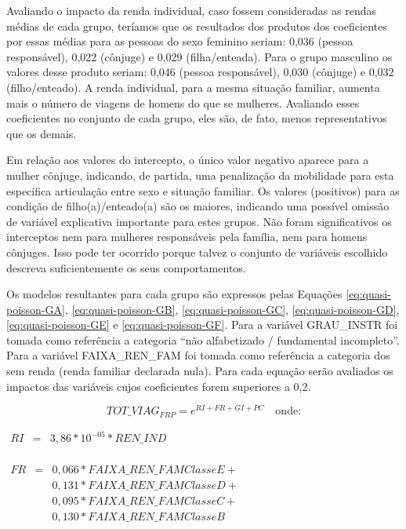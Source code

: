 Avaliando o impacto da renda individual, caso fossem consideradas as rendas médias de cada grupo, teríamos que os resultados dos produtos dos coeficientes por essas médias para as pessoas do sexo feminino seriam: 0,036 (pessoa responsável), 0,022 (cônjuge) e 0,029 (filha/enteada). Para o grupo masculino os valores desse produto seriam: 0,046 (pessoa responsável), 0,030 (cônjuge) e 0,032 (filho/enteado). A renda individual, para a mesma situação familiar, aumenta mais o número de viagens de homens do que se mulheres. Avaliando esses coeficientes no conjunto de cada grupo, eles são, de fato, menos representativos que os demais.

Em relação aos valores do intercepto, o único valor negativo aparece para a mulher cônjuge, indicando, de partida, uma penalização da mobilidade para esta específica articulação entre sexo e situação familiar.
Os valores (positivos) para as condição de filho(a)/enteado(a) são os maiores, indicando uma possível omissão de variável explicativa importante para estes grupos.
Não foram significativos os interceptos nem para mulheres responsáveis pela família, nem para homens cônjuges.
Isso pode ter ocorrido porque talvez o conjunto de variáveis escolhido descreva suficientemente os seus comportamentos.

Os modelos resultantes para cada grupo são expressos pelas Equações \ref{eq:quasi-poisson-GA}, \ref{eq:quasi-poisson-GB}, \ref{eq:quasi-poisson-GC}, \ref{eq:quasi-poisson-GD}, \ref{eq:quasi-poisson-GE} e \ref{eq:quasi-poisson-GF}. 
Para a variável GRAU_INSTR foi tomada como referência a categoria ``não alfabetizado / fundamental incompleto''. 
Para a variável \mbox{FAIXA_REN_FAM} foi tomada como referência a categoria dos sem renda (renda familiar declarada nula).
Para cada equação serão avaliados os impactos das variáveis cujos coeficientes forem superiores a 0,2.

\newpage
\begin{equation}\label{eq:quasi-poisson-GA} 
TOT\_VIAG _{FRP}= e^{RI + FR + GI + PC}
\quad \text{onde:}
\end{equation}

\begin{math}
\begin{array} {rcl}
RI & = & 3,86*10^{-05}*REN\_IND \\  
\end{array}
\end{math}

\begin{math}
\begin{array} {rcl}
FR & = & 0,066*FAIXA\_REN\_FAMClasse E + \\
   &   & 0,131*FAIXA\_REN\_FAMClasse D + \\
   &   & 0,095*FAIXA\_REN\_FAMClasse C + \\
   &   & 0,130*FAIXA\_REN\_FAMClasse B\\      
\end{array}
\end{math}

